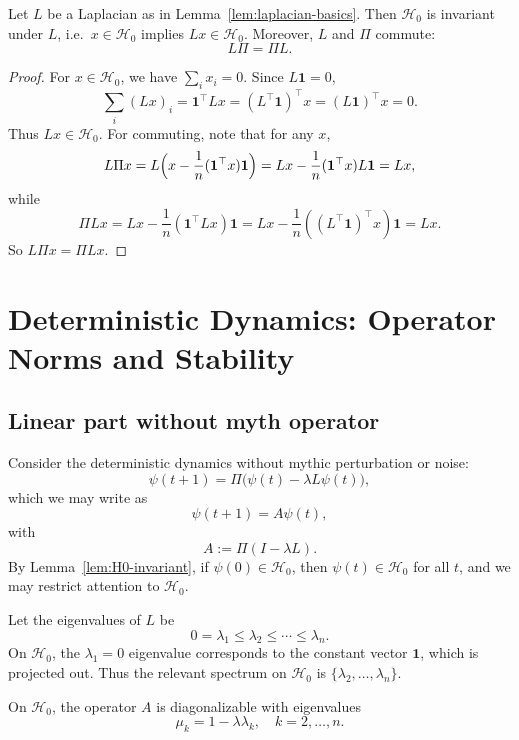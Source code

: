 \documentclass[11pt]{article}
\begin{document}
\begin{lemma}
\label{lem:H0-invariant}
Let \(L\) be a Laplacian as in Lemma~\ref{lem:laplacian-basics}. Then
\(\mathcal{H}_0\) is invariant under \(L\), i.e.\ \(x\in\mathcal{H}_0\)
implies \(Lx\in\mathcal{H}_0\). Moreover, \(L\) and \(\Pi\) commute:
\[
L\Pi = \Pi L.
\]
\end{lemma}

\begin{proof}
For \(x\in\mathcal{H}_0\), we have \(\sum_i x_i = 0\). Since \(L\mathbf{1}=0\),
\[
\sum_i (Lx)_i
  = \mathbf{1}^\top L x
  = (L^\top \mathbf{1})^\top x
  = (L\mathbf{1})^\top x = 0.
\]
Thus \(Lx\in\mathcal{H}_0\). For commuting, note that for any \(x\),
\[
L\Pi x
  = L\Bigl(x - \frac{1}{n}(\mathbf{1}^\top x)\mathbf{1}\Bigr)
  = Lx - \frac{1}{n}(\mathbf{1}^\top x)L\mathbf{1}
  = Lx,
\]
while
\[
\Pi L x
  = Lx - \frac{1}{n}(\mathbf{1}^\top Lx)\mathbf{1}
  = Lx - \frac{1}{n}( (L^\top \mathbf{1})^\top x)\mathbf{1}
  = Lx.
\]
So \(L\Pi x = \Pi L x\).
\end{proof}

\section{Deterministic Dynamics: Operator Norms and Stability}

\subsection{Linear part without myth operator}

Consider the deterministic dynamics without mythic perturbation or noise:
\begin{equation}
\psi(t+1) = \Pi\bigl(\psi(t) - \lambda L\psi(t)\bigr),
\label{eq:deterministic-noH}
\end{equation}
which we may write as
\[
\psi(t+1) = A \psi(t),
\]
with
\[
A := \Pi(I - \lambda L).
\]
By Lemma~\ref{lem:H0-invariant}, if \(\psi(0)\in\mathcal{H}_0\), then
\(\psi(t)\in\mathcal{H}_0\) for all \(t\), and we may restrict attention
to \(\mathcal{H}_0\).

Let the eigenvalues of \(L\) be
\[
0 = \lambda_1 \le \lambda_2 \le \cdots \le \lambda_n.
\]
On \(\mathcal{H}_0\), the \(\lambda_1=0\) eigenvalue corresponds to the
constant vector \(\mathbf{1}\), which is projected out. Thus the relevant
spectrum on \(\mathcal{H}_0\) is \(\{\lambda_2,\dots,\lambda_n\}\).

\begin{lemma}
\label{lem:A-spectrum}
On \(\mathcal{H}_0\), the operator \(A\) is diagonalizable with eigenvalues
\[
\mu_k = 1 - \lambda \lambda_k,\quad k=2,\dots,n.
\]
\end{lemma}
\end{document}

